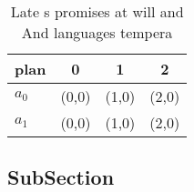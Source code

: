 \documentclass[a4paper]{article}
\begin{document}
\begin{table}
\begin{adjustbox}{width=0.5\columnwidth}
\begin{tabular}{|l|l|l|l|}
\hline
\textbf{plan} & \multicolumn{1}{c|}{\textbf{0}} & \multicolumn{1}{c|}{\textbf{1}} & \multicolumn{1}{c|}{\textbf{2}} \\ \hline
\textbf{$a_0$}  & (0,0) & (1,0) & (2,0) \\ \hline
\textbf{$a_1$}  & (0,0) & (1,0) & (2,0) \\ \hline
\end{tabular}
\end{adjustbox}
\caption{Late s promises at will and And languages tempera
}
\end{table}

\subsection{SubSection}
\end{document}
